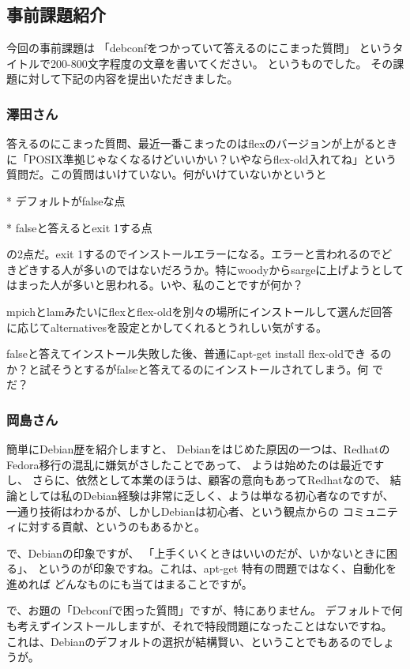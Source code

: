 \documentclass[mingoth,a4paper]{jsarticle}
\begin{document}
\subsection{事前課題紹介}

今回の事前課題は
「debconfをつかっていて答えるのにこまった質問」
というタイトルで200-800文字程度の文章を書いてください。
というものでした。
その課題に対して下記の内容を提出いただきました。

\subsubsection{澤田さん}

答えるのにこまった質問、最近一番こまったのはflexのバージョンが上がるとき
に「POSIX準拠じゃなくなるけどいいかい？いやならflex-old入れてね」という
質問だ。この質問はいけていない。何がいけていないかというと

* デフォルトがfalseな点

* falseと答えるとexit 1する点

の2点だ。exit 1するのでインストールエラーになる。エラーと言われるのでど
きどきする人が多いのではないだろうか。特にwoodyからsargeに上げようとして
はまった人が多いと思われる。いや、私のことですが何か？

mpichとlamみたいにflexとflex-oldを別々の場所にインストールして選んだ回答
に応じてalternativesを設定とかしてくれるとうれしい気がする。

falseと答えてインストール失敗した後、普通にapt-get install flex-oldでき
るのか？と試そうとするがfalseと答えてるのにインストールされてしまう。何
でだ？


\subsubsection{岡島さん}

簡単にDebian歴を紹介しますと、
Debianをはじめた原因の一つは、RedhatのFedora移行の混乱に嫌気がさしたことであって、
ようは始めたのは最近ですし、
さらに、依然として本業のほうは、顧客の意向もあってRedhatなので、
結論としては私のDebian経験は非常に乏しく、ようは単なる初心者なのですが、
一通り技術はわかるが、しかしDebianは初心者、という観点からの
コミュニティに対する貢献、というのもあるかと。

で、Debianの印象ですが、
「上手くいくときはいいのだが、いかないときに困る」、
というのが印象ですね。これは、apt-get 特有の問題ではなく、自動化を進めれば
どんなものにも当てはまることですが。

で、お題の「Debconfで困った質問」ですが、特にありません。
デフォルトで何も考えずインストールしますが、それで特段問題になったことはないですね。
これは、Debianのデフォルトの選択が結構賢い、ということでもあるのでしょうが。
\end{document}

